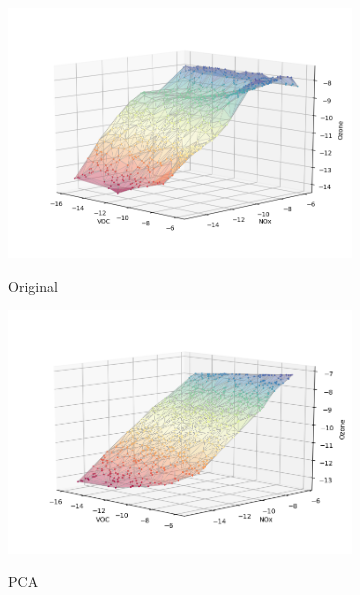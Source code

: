 \begin{figure}[H]

\begin{subfigure}{.33\textwidth}
  \centering
  \includegraphics[width=\textwidth]{4fig/original.png}
  \label{fig:orig}
  \caption{Original}
\end{subfigure}%
\begin{subfigure}{.33\textwidth}
  \centering
  \includegraphics[width=\textwidth]{4fig/rpca.png}
  \label{fig:pca}
  \caption{PCA}
\end{subfigure}%
\begin{subfigure}{.33\textwidth}
  \centering

\end{subfigure}
\end{figure}
